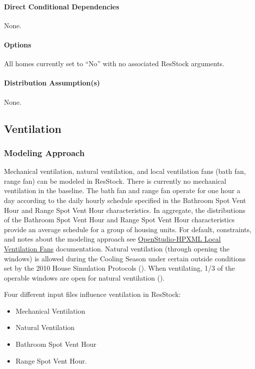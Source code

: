\paragraph{Direct Conditional Dependencies}
None.
\paragraph{Options}
All homes currently set to ``No'' with no associated ResStock arguments.
\paragraph{Distribution Assumption(s)}
None.

\subsection{Ventilation}
\subsubsection{Modeling Approach}
Mechanical ventilation, natural ventilation, and local ventilation fans (bath fan, range fan) can be modeled in ResStock. There is currently no mechanical ventilation in the baseline.  The bath fan and range fan operate for one hour a day according to the daily hourly schedule specified in the Bathroom Spot Vent Hour and Range Spot Vent Hour characteristics. In aggregate, the distributions of the Bathroom Spot Vent Hour and Range Spot Vent Hour characteristics provide an average schedule for a group of housing units. For default, constraints, and notes about the modeling approach see \href{https://openstudio-hpxml.readthedocs.io/en/v1.8.1/workflow_inputs.html#hpxml-local-ventilation-fans}{OpenStudio-HPXML Local Ventilation Fans} documentation. Natural ventilation (through opening the windows) is allowed during the Cooling Season under certain outside conditions set by the 2010 House Simulation Protocols (\cite{bahsp_2014}). When ventilating, 1/3 of the operable windows are open for natural ventilation (\cite{bahsp_2010}). 

Four different input files influence ventilation in ResStock:
\begin{itemize}
    \item Mechanical Ventilation
    \item Natural Ventilation
    \item Bathroom Spot Vent Hour
    \item Range Spot Vent Hour.
\end{itemize}

